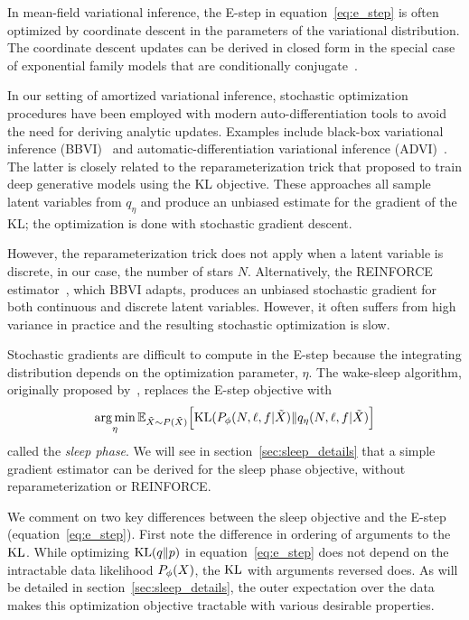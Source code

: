 In mean-field variational inference, the E-step in equation~\eqref{eq:e_step} is often optimized by coordinate descent in the parameters of the variational distribution. 
The coordinate descent updates can be derived in closed form in the special case of exponential family models that are conditionally conjugate~\cite{Blei_2017_vi_review}. 

In our setting of amortized variational inference, stochastic 
optimization procedures have been employed with modern 
auto-differentiation tools to avoid the need for deriving 
analytic updates. Examples include black-box variational inference (BBVI)~\cite{ranganath2013black} 
and automatic-differentiation variational inference (ADVI)~\cite{kucukelbir2016automatic}. The latter 
is closely related to the reparameterization trick that \cite{kingma2013autoencoding, rezende2014stochastic} proposed to train deep generative models using the KL objective. 
These approaches all sample latent variables from $q_\eta$ and produce an unbiased estimate 
for the gradient of the KL; the optimization is done with stochastic gradient descent. 

However, the reparameterization trick does not apply when a latent variable is discrete, in our case, the number of stars $N$. Alternatively, the REINFORCE estimator~\cite{Williams1992reinforce}, which BBVI adapts, produces an unbiased stochastic gradient for both continuous and discrete latent variables. However, it often suffers from high variance in practice and the resulting stochastic optimization is slow. 

Stochastic gradients are difficult to compute in the E-step because the integrating distribution depends on the optimization parameter, $\eta$. 
The wake-sleep algorithm, originally proposed by~\cite{Hinton1995wake_sleep}, replaces the 
E-step objective with 
\begin{align}
    \operatorname*{arg\,min}_{\eta} \mathbb{E}_{\tilde X \sim P(\tilde X)}\Big[\textrm{KL}(P_\phi(N, \ell, f | \tilde X) \| q_\eta(N, \ell, f | \tilde X)\Big]
    \label{eq:sleep_obj}
\end{align}
called the {\itshape sleep phase}. We will see in section~\ref{sec:sleep_details} that a simple gradient estimator can be derived for the sleep phase objective, without 
reparameterization or REINFORCE. 

We comment on two key differences between the sleep objective and the E-step (equation~\eqref{eq:e_step}). First note the difference in ordering of arguments to the $\textrm{KL}$. 
While optimizing $\textrm{KL}(q\|p)$ in equation~\eqref{eq:e_step} does not depend on the intractable 
data likelihood $P_\phi(X)$, the $\textrm{KL}$ with arguments reversed does. 
As will be detailed in section~\ref{sec:sleep_details}, the outer expectation over the data makes this optimization objective tractable with various desirable properties. 

